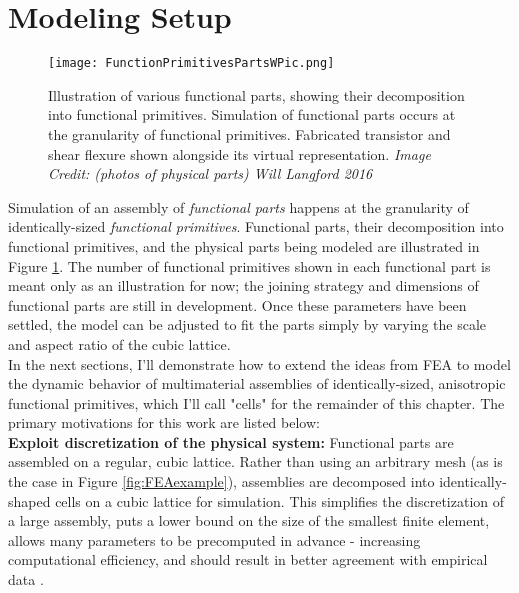 {\section{Modeling Setup}

\begin{figure}
  \texttt{[image: FunctionPrimitivesPartsWPic.png]}
  \caption{Illustration of various functional parts, showing their decomposition into functional primitives.  Simulation of functional parts occurs at the granularity of functional primitives.  Fabricated transistor and shear flexure shown alongside its virtual representation.  \textit{Image Credit: (photos of physical parts) Will Langford 2016}}
  \label{fig:FunctionPrimitivesPartsWPic}
\end{figure}

Simulation of an assembly of \textit{functional parts} happens at the granularity of identically-sized \textit{functional primitives}.  Functional parts, their decomposition into functional primitives, and the physical parts being modeled are illustrated in Figure \ref{fig:FunctionPrimitivesPartsWPic}.  The number of functional primitives shown in each functional part is meant only as an illustration for now; the joining strategy and dimensions of functional parts are still in development.  Once these parameters have been settled, the model can be adjusted to fit the parts simply by varying the scale and aspect ratio of the cubic lattice.\\

In the next sections, I'll demonstrate how to extend the ideas from FEA to model the dynamic behavior of multimaterial assemblies of identically-sized, anisotropic functional primitives, which I'll call "cells" for the remainder of this chapter.  The primary motivations for this work are listed below:\\

\textbf{Exploit discretization of the physical system:} Functional parts are assembled on a regular, cubic lattice.  Rather than using an arbitrary mesh (as is the case in Figure \ref{fig:FEAexample}), assemblies are decomposed into identically-shaped cells on a cubic lattice for simulation.  This simplifies the discretization of a large assembly, puts a lower bound on the size of the smallest finite element, allows many parameters to be precomputed in advance - increasing computational efficiency, and should result in better agreement with empirical data \cite{Calisch2014}.\\

}
